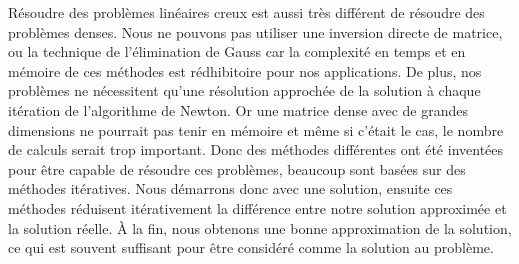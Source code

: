Résoudre des problèmes linéaires creux est aussi très différent de résoudre des problèmes denses.
%
Nous ne pouvons pas utiliser une inversion directe de matrice, ou la technique de l'élimination de Gauss car la complexité en temps et en mémoire de ces méthodes est rédhibitoire pour nos applications.
%
De plus, nos problèmes ne nécessitent qu'une résolution approchée de la solution à chaque itération de l'algorithme de Newton.
%
Or une matrice dense avec de grandes dimensions ne pourrait pas tenir en mémoire et même si c'était le cas, le nombre de calculs serait trop important.
%
Donc des méthodes différentes ont été inventées pour être capable de résoudre ces problèmes, beaucoup sont basées sur des méthodes itératives.
%
Nous démarrons donc avec une solution, ensuite ces méthodes réduisent itérativement la différence entre notre solution approximée et la solution réelle.
%
\`{A} la fin, nous obtenons une bonne approximation de la solution, ce qui est souvent suffisant pour être considéré comme la solution au problème.
